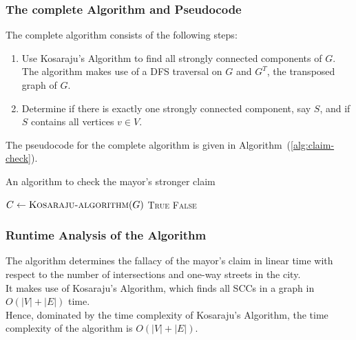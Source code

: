 \documentclass[12pt]{report}
\begin{document}
    \subsubsection*{The complete Algorithm and Pseudocode}
    The complete algorithm consists of the following steps:
    \begin{enumerate}
        \item
        Use Kosaraju's Algorithm to find all strongly connected components of $G$.
        The algorithm makes use of a DFS traversal on $G$ and $G^{T}$, the transposed graph of $G$.
        \item Determine if there is exactly one strongly connected component, say $S$, and if $S$ contains all vertices $v \in V$.
    \end{enumerate}
    The pseudocode for the complete algorithm is given in Algorithm~(\ref{alg:claim-check}).

    \begin{algorithm}
        \caption{An algorithm to check the mayor's stronger claim}
        \label{alg:claim-check}
        \begin{algorithmic}[1]
            \State $C \gets \Call{Kosaraju-algorithm}{G}$ 
                \State \Return \textsc{True}
            \Else
                \State \Return \textsc{False}
            \EndIf
            \EndProcedure
        \end{algorithmic}
    \end{algorithm}

    \subsubsection*{Runtime Analysis of the Algorithm}
    The algorithm determines the fallacy of the mayor's claim in linear time with respect to the number of intersections and one-way streets in the city. \\
    It makes use of Kosaraju's Algorithm, which finds all SCCs in a graph in $O(|V|+|E|)$ time.
    \vspace*{10pt} \\
    Hence, dominated by the time complexity of Kosaraju's Algorithm, the time complexity of the algorithm is $O(|V|+|E|)$.
\end{document}
